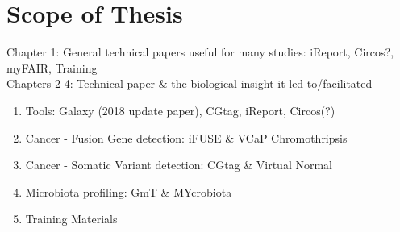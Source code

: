 \chapter*{Scope of Thesis}

Chapter 1: General technical papers useful for many studies: iReport, Circos?, myFAIR, Training \\
Chapters 2-4: Technical paper \& the biological insight it led to/facilitated \\

\begin{enumerate}
    \item Tools: Galaxy (2018 update paper), CGtag, iReport, Circos(?)
    \item Cancer - Fusion Gene detection: iFUSE \& VCaP Chromothripsis
    \item Cancer - Somatic Variant detection: CGtag \& Virtual Normal
    \item Microbiota profiling: GmT \& MYcrobiota
    \item Training Materials
\end{enumerate}
